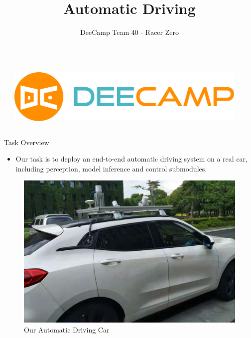 \documentclass[final,dvipsnames]{beamer}
\title{
  Automatic Driving
}
\author{
  DeeCamp Team 40 - Racer Zero
}
\date{}
\begin{document}
\begin{frame}[t, fragile = singleslide]{}

\begin{columns}[t]

\begin{column}{0.02\textwidth}
\end{column}

\begin{column}{0.16\textwidth}
\flushleft
\includegraphics[width = 0.8\columnwidth]{./assets/deecamp_logo.jpg}
\end{column}

\begin{column}{0.6\textwidth}
\titlepage
\end{column}

\begin{column}{0.24\textwidth}
\end{column}

\end{columns}

\begin{columns}[t]

\begin{column}{0.3\textwidth}

\begin{block}{Task Overview}
  \begin{itemize}
    \item Our task is to deploy an end-to-end automatic driving system on a real car, including perception, model inference and control submodules.
  \end{itemize}
  \begin{figure}[ht]
    \centering
    \includegraphics[width = 0.6\columnwidth]{./assets/auto_car.jpeg}
    \caption{Our Automatic Driving Car}
    \label{fig:label}
  \end{figure}


\end{block}
\end{column}
\end{columns}
\end{frame}
\end{document}
